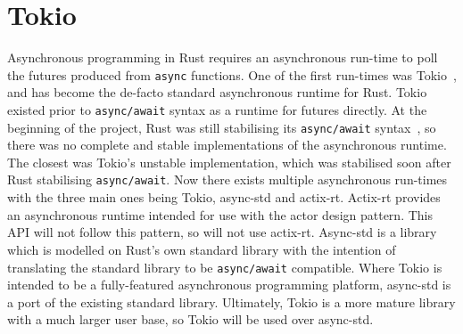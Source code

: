 \newcommand{\asyncawait}{\texttt{async/await}}

\section{Tokio}\label{sec:tokio}
Asynchronous programming in Rust requires an asynchronous run-time to poll the futures produced from \texttt{async}
functions.
One of the first run-times was Tokio~\citep{tokiocommunity_tokioasynchronousruntime_}, and has become the de-facto standard
asynchronous runtime for Rust.
Tokio existed prior to \asyncawait{} syntax as a runtime for futures directly.
At the beginning of the project, Rust was still stabilising its \asyncawait{} syntax~\citep{withoutboats_asyncawaitnotation_},
so there was no
complete and stable implementations of the asynchronous runtime.
The closest was Tokio's unstable implementation, which was stabilised soon after Rust stabilising
\asyncawait{}.
Now there exists multiple asynchronous run-times with the three main ones being Tokio, async-std and actix-rt.
Actix-rt provides an asynchronous runtime intended for use with the actor design pattern.
This API will not follow this pattern, so will not use actix-rt.
Async-std is a library which is modelled on Rust's own standard library with the intention of translating the standard
library to be \asyncawait{} compatible.
Where Tokio is intended to be a fully-featured asynchronous programming platform, async-std is a port of the existing
standard library.
Ultimately, Tokio is a more mature library with a much larger user base, so Tokio will be used over async-std.


